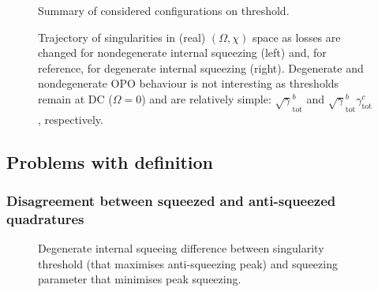 


\begin{figure}
	\centering
	\caption{Summary of considered configurations on threshold. }
	\label{fig:}
\end{figure}

\begin{figure}
	\centering
	\caption{Trajectory of singularities in (real) $(\Omega, \chi)$ space as losses are changed for nondegenerate internal squeezing (left) and, for reference, for degenerate internal squeezing (right). Degenerate and nondegenerate OPO behaviour is not interesting as thresholds remain at DC ($\Omega=0$) and are relatively simple: $\sqrt \gamma^b_\text{tot}$ and $\sqrt \gamma^b_\text{tot} \gamma^c_\text{tot}$, respectively.}
	\label{fig:}
\end{figure}



\subsection{Problems with definition}


\subsubsection{Disagreement between squeezed and anti-squeezed quadratures}


\begin{figure}
	\centering
	\caption{Degenerate internal squeeing difference between singularity threshold (that maximises anti-squeezing peak) and squeezing parameter that minimises peak squeezing.}
	\label{fig:}
\end{figure}

